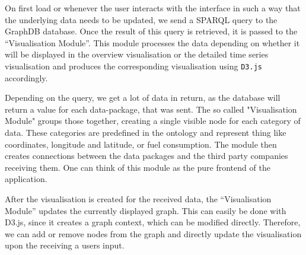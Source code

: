 \documentclass[../paper.tex]{subfiles}
\begin{document}
  On first load or whenever the user interacts with the interface in such a way
  that the underlying data needs to be updated, we send a SPARQL query to the
  GraphDB database. Once the result of this query is retrieved, it is passed to
  the “Visualisation Module”. This module processes the data depending on
  whether it will be displayed in the overview visualisation or the detailed
  time series visualisation and produces the corresponding visualisation
  using \texttt{D3.js} accordingly.

  Depending on the query, we get a lot of data in return, as the database
  will return a value for each data-package, that was sent. The so called
  "Visualisation Module" groups those together, creating a single visible
  node for each category of data. These categories are predefined in the
  ontology and represent thing like coordinates, longitude and latitude, or
  fuel consumption. The module then creates connections between the data packages
  and the third party companies receiving them. One can think of this module
  as the pure frontend of the application.

  After the visualisation is created for the received data, the “Visualisation Module”
  updates the currently displayed graph. This can easily be done with D3.js, since
  it creates a graph context, which can be modified directly. Therefore,
  we can add or remove nodes from the graph and directly update the visualisation
  upon the receiving a users input.
\end{document}
